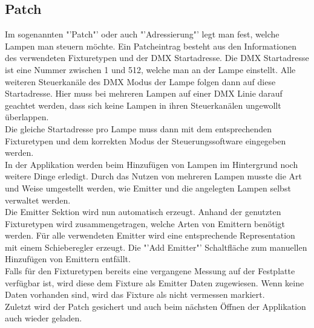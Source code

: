 \documentclass[11pt]{scrartcl}
\begin{document}
\subsection{Patch}
Im sogenannten "'Patch"' oder auch "'Adressierung"' legt man fest, welche Lampen man steuern möchte. Ein Patcheintrag besteht aus den Informationen
des verwendeten Fixturetypen und der DMX Startadresse. Die DMX Startadresse ist eine Nummer zwischen 1 und 512, welche man an der Lampe einstellt.
Alle weiteren Steuerkanäle des DMX Modus der Lampe folgen dann auf diese Startadresse. Hier muss bei mehreren Lampen auf einer DMX Linie darauf geachtet
werden, dass sich keine Lampen in ihren Steuerkanälen ungewollt überlappen.\\
Die gleiche Startadresse pro Lampe muss dann mit dem entsprechenden Fixturetypen und dem korrekten Modus der Steuerungssoftware eingegeben werden.\\
In der Applikation werden beim Hinzufügen von Lampen im Hintergrund noch weitere Dinge erledigt. Durch das Nutzen von mehreren Lampen musste die Art
und Weise umgestellt werden, wie Emitter und die angelegten Lampen selbst verwaltet werden.\\
Die Emitter Sektion wird nun automatisch erzeugt. Anhand der genutzten Fixturetypen wird zusammengetragen, welche Arten von Emittern benötigt werden.
Für alle verwendeten Emitter wird eine entsprechende Representation mit einem Schieberegler erzeugt. Die "'Add Emitter"' Schaltfläche zum manuellen
Hinzufügen von Emittern entfällt.\\
Falls für den Fixturetypen bereits eine vergangene Messung auf der Festplatte verfügbar ist, wird diese dem Fixture als Emitter Daten zugewiesen.
Wenn keine Daten vorhanden sind, wird das Fixture als nicht vermessen markiert.\\
Zuletzt wird der Patch gesichert und auch beim nächsten Öffnen der Applikation auch wieder geladen.
\end{document}

